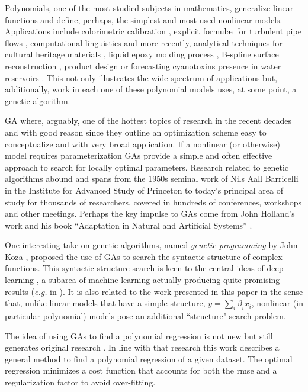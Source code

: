 \documentclass[final,authoryear,3p,times,twocolumn]{elsarticle}
\begin{document}
Polynomials, one of the most studied subjects in mathematics, generalize li\-ne\-ar functions and define, perhaps, the simplest and most used nonlinear models. Applications include colorimetric calibration \citep{mendes2005adaptive}, explicit formul\ae\ for turbulent pipe flows \citep{davidson1999method}, computational linguistics \citep{sanchez2009obtaining} and more recently, analytical techniques for cultural heritage materials \citep{csefalvayova2010use}, liquid epoxy molding process \citep{chan2011modeling}, B-spline surface reconstruction \citep{galvez2012iterative}, product design \citep{chan2012development} or forecasting cyanotoxins presence in water reservoirs \citep{garcia2013hybrid}. This not only illustrates the wide spectrum of applications but, additionally, work in each one of these polynomial models uses, at some point, a genetic algorithm.

\ac{GA} where, arguably, one of the hottest topics of research in the recent decades and with good reason since they outline an optimization scheme easy to conceptualize and with very broad application. If a nonlinear (or otherwise) model requires parameterization \acp{GA} provide a simple and often effective approach to search for locally optimal parameters. Research related to genetic algorithms abound and spans from the 1950s seminal work of Nils Aall Barricelli \citep{barricelli1962numerical} in the Institute for Advanced Study of Princeton to today's principal area of study for thousands of researchers, covered in hundreds of conferences, workshops and other meetings. Perhaps the key impulse to \acp{GA} come from John Holland's work and his book ``Adaptation in Natural and Artificial Systems'' \citep{holland1975adaptation}.  

One interesting take on genetic algorithms, named \emph{genetic programming} by John Koza \citep{koza1992genetic}, proposed the use of \acp{GA} to search the syntactic structure of complex functions. This syntactic structure search is keen to the central ideas of deep learning \citep{bengio2013representation, bengio2009learning}, a subarea of machine learning actually producing quite promising results (\emph{e.g.} in \cite{Tarlow:2013fk}). It is also related to the work presented in this paper in the sense that, unlike linear models that have a simple structure, $y=\sum_i \beta_i x_i$, nonlinear (in particular polynomial) models pose an additional ``structure" search problem.

The idea of using \acp{GA} to find a polynomial regression is not new \citep{maertens2006genetic, yu2008optimal, wu2009novel} but still generates original research \citep{hofwing2011optimal, cetisli2011polynomial}. In line with that research this work describes a general method to find a polynomial regression of a given dataset. The optimal regression minimizes a cost function that accounts for both the \ac{rmse} and a regularization factor to avoid over-fitting. 
\end{document}
